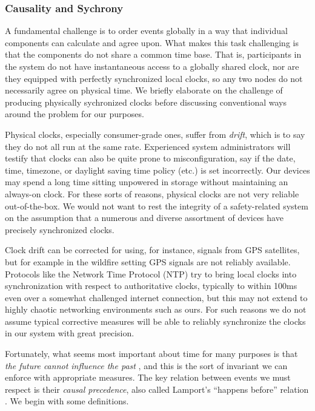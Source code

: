 \documentclass[]             %
{NASA}                       %
\theoremstyle{definition}
\begin{document}
\subsubsection{Causality and  Sychrony}
\label{ssec:causality}
A fundamental challenge is to order events globally in a way that
individual components can calculate and agree upon. What makes this
task challenging is that the components do not share a common time
base. That is, participants in the system do not have instantaneous
access to a globally shared clock, nor are they equipped with
perfectly synchronized local clocks, so any two nodes do not
necessarily agree on physical time. We briefly elaborate on the
challenge of producing physically sychronized clocks before discussing
conventional ways around the problem for our purposes.

Physical clocks, especially consumer-grade ones, suffer from
\emph{drift}, which is to say they do not all run at the same
rate. Experienced system administrators will testify that clocks can
also be quite prone to misconfiguration, say if the date, time,
timezone, or daylight saving time policy (etc.) is set
incorrectly. Our devices may spend a long time sitting unpowered in
storage without maintaining an always-on clock. For these sorts of
reasons, physical clocks are not very reliable out-of-the-box. We
would not want to rest the integrity of a safety-related system on the
assumption that a numerous and diverse assortment of devices have
precisely synchronized clocks.

Clock drift can be corrected for using, for instance, signals from GPS
satellites, but for example in the wildfire setting GPS signals are
not reliably available. Protocols like the Network Time Protocol (NTP)
\cite{rfc1119} try to bring local clocks into synchronization with
respect to authoritative clocks, typically to within 100ms even over a
somewhat challenged internet connection, but this may not extend to
highly chaotic networking environments such as ours. For such reasons
we do not assume typical corrective measures will be able to reliably
synchronize the clocks in our system with great precision.

Fortunately, what seems most important about time for many purposes is
that \emph{the future cannot influence the past} \cite{1989mattern}, and
this is the sort of invariant we can enforce with appropriate
measures. The key relation between events we must respect is their
\emph{causal precedence}, also called Lamport's ``happens before''
relation \cite{1978:lamportclocks}. We begin with some definitions.
\end{document}
